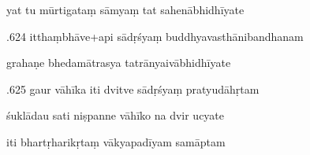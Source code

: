 \documentclass[article,12pt,a4paper]{memoir}%
\newcounter{parCount}
\begin{document}
	  
	  \pstart \leavevmode%
	yat tu mūrtigataṃ sāmyaṃ tat sahenābhidhīyate 
	{}
	\pend%
      

	  
	  \pstart {}.624 itthaṃbhāve+api sādṛśyaṃ   buddhyavasthānibandhanam 
	{}
	\pend%
      

	  
	  \pstart \leavevmode%
	grahaṇe bhedamātrasya tatrānyaivābhidhīyate 
	{}
	\pend%
      

	  
	  \pstart {}.625 gaur vāhīka iti dvitve sādṛśyaṃ pratyudāhṛtam 
	{}
	\pend%
      

	  
	  \pstart \leavevmode%
	śuklādau sati niṣpanne vāhīko na dvir ucyate 
	{}
	\pend%
      
		
		\pstart
		\begin{center}
	      iti bhartṛharikṛtaṃ vākyapadīyam samāptam
		\end{center}
		\pend
		
	      
	    
	    \endnumbering%
	    
     \backmatter 
\end{document}
